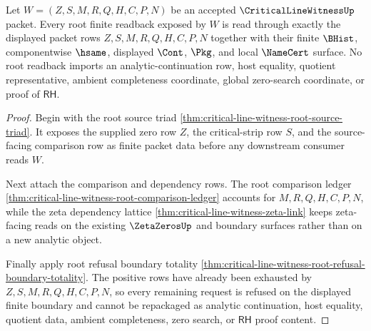 \begin{theorem}
\label{thm:critical-line-witness-root-finite-readback-totality}
Let $W=(Z,S,M,R,Q,H,C,P,N)$ be an accepted $\CriticalLineWitnessUp$
packet. Every root finite readback exposed by $W$ is read through exactly the
displayed packet rows $Z,S,M,R,Q,H,C,P,N$ together with their finite
$\BHist$, componentwise $\hsame$, displayed $\Cont$, $\Pkg$, and local
$\NameCert$ surface. No root readback imports an analytic-continuation row,
host equality, quotient representative, ambient completeness coordinate,
global zero-search coordinate, or proof of $\mathsf{RH}$.
\end{theorem}
\begin{proof}
Begin with the root source triad
\autoref{thm:critical-line-witness-root-source-triad}. It exposes the supplied
zero row $Z$, the critical-strip row $S$, and the source-facing comparison row
as finite packet data before any downstream consumer reads $W$.

Next attach the comparison and dependency rows. The root comparison ledger
\autoref{thm:critical-line-witness-root-comparison-ledger} accounts for
$M,R,Q,H,C,P,N$, while the zeta dependency lattice
\autoref{thm:critical-line-witness-zeta-link} keeps zeta-facing reads on the
existing $\ZetaZerosUp$ and boundary surfaces rather than on a new analytic
object.

Finally apply root refusal boundary totality
\autoref{thm:critical-line-witness-root-refusal-boundary-totality}. The
positive rows have already been exhausted by $Z,S,M,R,Q,H,C,P,N$, so every
remaining request is refused on the displayed finite boundary and cannot be
repackaged as analytic continuation, host equality, quotient data, ambient
completeness, zero search, or $\mathsf{RH}$ proof content.
\end{proof}

